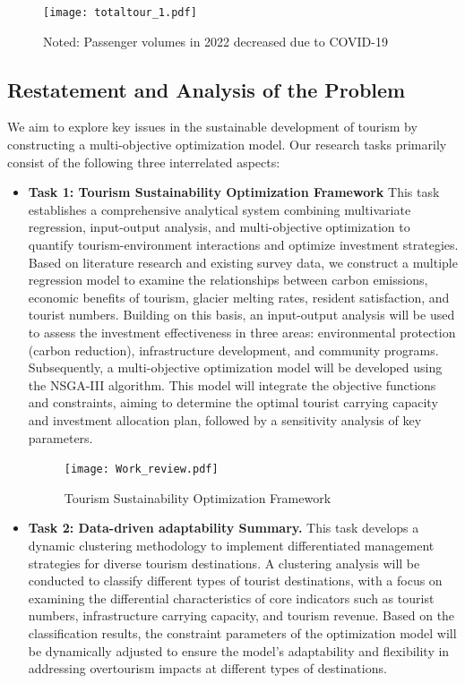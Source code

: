 \documentclass{mcmthesis}
\begin{document}
\begin{figure}[h] 
  \centering
  \texttt{[image: totaltour\_1.pdf]}
  \caption*{Noted: Passenger volumes in 2022 decreased due to COVID-19}\label{fig1}
  \end{figure}

  \subsection{Restatement and Analysis of the Problem}

  We aim to explore key issues in the sustainable development of tourism by constructing a 
  multi-objective optimization model. Our research tasks primarily consist of the following three 
  interrelated aspects:
\begin{itemize}
  \item \textbf{Task 1:  Tourism Sustainability Optimization Framework} This task establishes a comprehensive analytical system combining multivariate regression, input-output analysis, and multi-objective optimization to quantify tourism-environment interactions and optimize investment strategies. Based on literature research and existing survey data, we construct a multiple regression model to examine the relationships between carbon emissions, economic benefits of tourism, glacier melting rates, resident satisfaction, and tourist numbers. Building on this basis, an input-output analysis will be used to assess the investment effectiveness in three areas: environmental protection (carbon reduction), infrastructure development, and community programs. Subsequently, a multi-objective optimization model will be developed using the NSGA-III algorithm. This model will integrate the objective functions and constraints, aiming to determine the optimal tourist carrying capacity and investment allocation plan, followed by a sensitivity analysis of key parameters.
  \begin{figure}[h!] 
    \centering
    \texttt{[image: Work\_review.pdf]}
    \caption{Tourism Sustainability Optimization Framework} \label{fig2}
  \end{figure}
  \item \textbf{Task 2: Data-driven adaptability Summary.} This task develops a dynamic clustering methodology to implement differentiated management strategies for diverse tourism destinations. A clustering analysis will be conducted to classify different types of tourist destinations, with a focus on examining the differential characteristics of core indicators such as tourist numbers, infrastructure carrying capacity, and tourism revenue. Based on the classification results, the constraint parameters of the optimization model will be dynamically adjusted to ensure the model's adaptability and flexibility in addressing overtourism impacts at different types of destinations.

\end{itemize}
\end{document}
